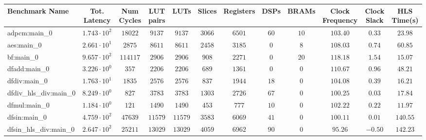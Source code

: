 \begin{tabular}{|l|c|c|c|c|c|c|c|c|c|c|c|}
\hline
Benchmark Name          & Tot. Latency           & Num Cycles & LUT pairs & LUTs      & Slices    & Registers & DSPs    & BRAMs   & Clock Frequency & Clock Slack & HLS Time(s) \\
\hline
adpcm:main\_0           & $ 1.743 \cdot 10^{2} $ & $ 18022  $ & $ 9137  $ & $ 9137  $ & $ 3066  $ & $ 6501  $ & $ 60  $ & $ 10  $ & $ 103.40      $ & $ 0.33    $ & $ 23.98   $ \\
aes:main\_0             & $ 2.661 \cdot 10^{1} $ & $ 2875   $ & $ 8611  $ & $ 8611  $ & $ 2458  $ & $ 3185  $ & $ 0   $ & $ 8   $ & $ 108.03      $ & $ 0.74    $ & $ 60.85   $ \\
bf:main\_0              & $ 9.657 \cdot 10^{2} $ & $ 114117 $ & $ 2906  $ & $ 2906  $ & $ 908   $ & $ 2271  $ & $ 0   $ & $ 20  $ & $ 118.18      $ & $ 1.54    $ & $ 15.07   $ \\
dfadd:main\_0           & $ 3.226 \cdot 10^{0} $ & $ 357    $ & $ 2206  $ & $ 2206  $ & $ 689   $ & $ 1361  $ & $ 0   $ & $ 0   $ & $ 110.67      $ & $ 0.96    $ & $ 48.21   $ \\
dfdiv:main\_0           & $ 1.763 \cdot 10^{1} $ & $ 1835   $ & $ 2576  $ & $ 2576  $ & $ 837   $ & $ 1944  $ & $ 18  $ & $ 0   $ & $ 104.08      $ & $ 0.39    $ & $ 16.21   $ \\
dfdiv\_hls\_div:main\_0 & $ 8.249 \cdot 10^{0} $ & $ 827    $ & $ 3783  $ & $ 3783  $ & $ 1303  $ & $ 2726  $ & $ 67  $ & $ 0   $ & $ 100.25      $ & $ 0.03    $ & $ 17.84   $ \\
dfmul:main\_0           & $ 1.184 \cdot 10^{0} $ & $ 121    $ & $ 1490  $ & $ 1490  $ & $ 453   $ & $ 777   $ & $ 10  $ & $ 0   $ & $ 102.22      $ & $ 0.22    $ & $ 11.97   $ \\
dfsin:main\_0           & $ 4.759 \cdot 10^{2} $ & $ 47639  $ & $ 11579 $ & $ 11579 $ & $ 3583  $ & $ 6069  $ & $ 41  $ & $ 0   $ & $ 100.11      $ & $ 0.01    $ & $ 140.55  $ \\
dfsin\_hls\_div:main\_0 & $ 2.647 \cdot 10^{2} $ & $ 25211  $ & $ 13029 $ & $ 13029 $ & $ 4059  $ & $ 6962  $ & $ 90  $ & $ 0   $ & $ 95.26       $ & $ -0.50   $ & $ 142.23  $ \\

\end{tabular}
